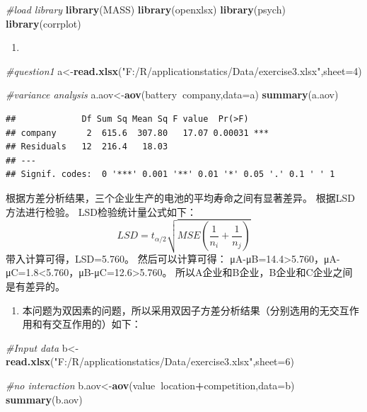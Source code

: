 \documentclass[]{article}
\newenvironment{Shaded}{\begin{snugshade}}{\end{snugshade}}
\newcommand{\KeywordTok}[1]{\textcolor[rgb]{0.13,0.29,0.53}{\textbf{#1}}}
\newcommand{\DataTypeTok}[1]{\textcolor[rgb]{0.13,0.29,0.53}{#1}}
\newcommand{\DecValTok}[1]{\textcolor[rgb]{0.00,0.00,0.81}{#1}}
\newcommand{\StringTok}[1]{\textcolor[rgb]{0.31,0.60,0.02}{#1}}
\newcommand{\CommentTok}[1]{\textcolor[rgb]{0.56,0.35,0.01}{\textit{#1}}}
\newcommand{\OperatorTok}[1]{\textcolor[rgb]{0.81,0.36,0.00}{\textbf{#1}}}
\newcommand{\NormalTok}[1]{#1}
\providecommand{\tightlist}{%
  \setlength{\itemsep}{0pt}\setlength{\parskip}{0pt}}
\begin{document}
\begin{Shaded}
\begin{Highlighting}[]
\CommentTok{#load library}
\KeywordTok{library}\NormalTok{(MASS)}
\KeywordTok{library}\NormalTok{(openxlsx)}
\KeywordTok{library}\NormalTok{(psych)}
\KeywordTok{library}\NormalTok{(corrplot)}
\end{Highlighting}
\end{Shaded}

\begin{enumerate}
\def\labelenumi{\arabic{enumi}.}
\item
\end{enumerate}

\begin{Shaded}
\begin{Highlighting}[]
\CommentTok{#question1}
\NormalTok{a<-}\KeywordTok{read.xlsx}\NormalTok{(}\StringTok{"F:/R/applicationstatics/Data/exercise3.xlsx"}\NormalTok{,}\DataTypeTok{sheet=}\DecValTok{4}\NormalTok{)}

\CommentTok{#variance analysis}
\NormalTok{a.aov<-}\KeywordTok{aov}\NormalTok{(battery}\OperatorTok{~}\NormalTok{company,}\DataTypeTok{data=}\NormalTok{a)}
\KeywordTok{summary}\NormalTok{(a.aov)}
\end{Highlighting}
\end{Shaded}

\begin{verbatim}
##             Df Sum Sq Mean Sq F value  Pr(>F)    
## company      2  615.6  307.80   17.07 0.00031 ***
## Residuals   12  216.4   18.03                    
## ---
## Signif. codes:  0 '***' 0.001 '**' 0.01 '*' 0.05 '.' 0.1 ' ' 1
\end{verbatim}

根据方差分析结果，三个企业生产的电池的平均寿命之间有显著差异。
根据LSD方法进行检验。 LSD检验统计量公式如下：
\[ LSD=t_{\alpha/2}\sqrt{MSE(\frac{1}{n_i}+\frac{1}{n_j})} \]
带入计算可得，LSD=5.760。 然后可以计算可得：
\textbar{}μA-μB\textbar{}=14.4\textgreater{}5.760，\textbar{}μA-μC\textbar{}=1.8\textless{}5.760，\textbar{}μB-μC\textbar{}=12.6\textgreater{}5.760。
所以A企业和B企业，B企业和C企业之间是有差异的。

\begin{enumerate}
\def\labelenumi{\arabic{enumi}.}
\setcounter{enumi}{1}
\tightlist
\item
  本问题为双因素的问题，所以采用双因子方差分析结果（分别选用的无交互作用和有交互作用的）如下：
\end{enumerate}

\begin{Shaded}
\begin{Highlighting}[]
\CommentTok{#Input data}
\NormalTok{b<-}\KeywordTok{read.xlsx}\NormalTok{(}\StringTok{"F:/R/applicationstatics/Data/exercise3.xlsx"}\NormalTok{,}\DataTypeTok{sheet=}\DecValTok{6}\NormalTok{)}

\CommentTok{#no interaction}
\NormalTok{b.aov<-}\KeywordTok{aov}\NormalTok{(value}\OperatorTok{~}\NormalTok{location}\OperatorTok{+}\NormalTok{competition,}\DataTypeTok{data=}\NormalTok{b)}
\KeywordTok{summary}\NormalTok{(b.aov)}
\end{Highlighting}
\end{Shaded}
\end{document}
